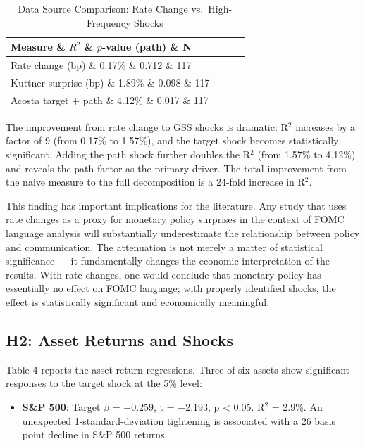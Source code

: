 \documentclass[12pt]{article}
\begin{document}
\begin{table}[htbp]\centering\caption{Data Source Comparison: Rate Change vs.\ High-Frequency Shocks}\label{tab:comparison}
\begin{tabular}{lccc}\toprule
Measure \& $R^2$ \& $p$-value (path) \& N \\\midrule
Rate change (bp) \& 0.17\% \& 0.712 \& 117 \\
Kuttner surprise (bp) \& 1.89\% \& 0.098 \& 117 \\
Acosta target + path \& 4.12\% \& 0.017 \& 117 \\\bottomrule\end{tabular}
\par\vspace{2pt}{\footnotesize All regressions include Newey-West HAC standard errors with lag=4.}\end{table}


The improvement from rate change to GSS shocks is dramatic: R$^2$ increases by a factor of 9 (from 0.17\% to 1.57\%), and the target shock becomes statistically significant. Adding the path shock further doubles the R$^2$ (from 1.57\% to 4.12\%) and reveals the path factor as the primary driver. The total improvement from the naive measure to the full decomposition is a 24-fold increase in R$^2$.

This finding has important implications for the literature. Any study that uses rate changes as a proxy for monetary policy surprises in the context of FOMC language analysis will substantially underestimate the relationship between policy and communication. The attenuation is not merely a matter of statistical significance --- it fundamentally changes the economic interpretation of the results. With rate changes, one would conclude that monetary policy has essentially no effect on FOMC language; with properly identified shocks, the effect is statistically significant and economically meaningful.

\subsection{H2: Asset Returns and Shocks}

Table 4 reports the asset return regressions. Three of six assets show significant responses to the target shock at the 5\% level:

\begin{itemize}
\item \textbf{S\&P 500}: Target $\beta$ = $-$0.259, t = $-$2.193, p < 0.05. R$^2$ = 2.9\%. An unexpected 1-standard-deviation tightening is associated with a 26 basis point decline in S\&P 500 returns.
\end{itemize}
\end{document}
